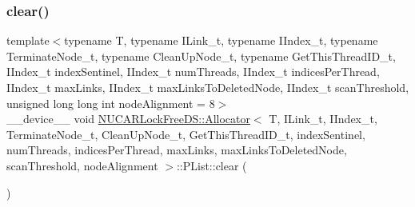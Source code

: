 \subsubsection{\texorpdfstring{clear()}{clear()}}
{\footnotesize\ttfamily template$<$typename T, typename I\+Link\+\_\+t, typename I\+Index\+\_\+t, typename Terminate\+Node\+\_\+t, typename Clean\+Up\+Node\+\_\+t, typename Get\+This\+Thread\+I\+D\+\_\+t, I\+Index\+\_\+t index\+Sentinel, I\+Index\+\_\+t num\+Threads, I\+Index\+\_\+t indices\+Per\+Thread, I\+Index\+\_\+t max\+Links, I\+Index\+\_\+t max\+Links\+To\+Deleted\+Node, I\+Index\+\_\+t scan\+Threshold, unsigned long long int node\+Alignment = 8$>$ \\
\+\_\+\+\_\+device\+\_\+\+\_\+ void \mbox{\hyperlink{class_n_u_c_a_r_lock_free_d_s_1_1_allocator}{N\+U\+C\+A\+R\+Lock\+Free\+D\+S\+::\+Allocator}}$<$ T, I\+Link\+\_\+t, I\+Index\+\_\+t, Terminate\+Node\+\_\+t, Clean\+Up\+Node\+\_\+t, Get\+This\+Thread\+I\+D\+\_\+t, index\+Sentinel, num\+Threads, indices\+Per\+Thread, max\+Links, max\+Links\+To\+Deleted\+Node, scan\+Threshold, node\+Alignment $>$\+::P\+List\+::clear (\begin{DoxyParamCaption}{ }\end{DoxyParamCaption})\hspace{0.3cm}{\ttfamily [inline]}}

\mbox{\label{class_n_u_c_a_r_lock_free_d_s_1_1_allocator_1_1_p_list_a7131962e802f28f5bf5220211c7f5eb8}} 
